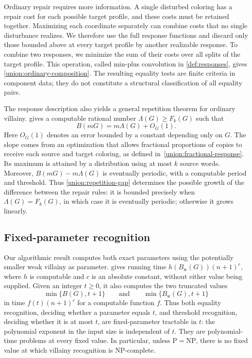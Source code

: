 \documentclass[11pt,reqno]{amsart}
\numberwithin{equation}{section}
\theoremstyle{definition}
\theoremstyle{remark}
\begin{document}
Ordinary repair requires more information. A single disturbed coloring
has a repair cost for each possible target profile, and these costs
must be retained together. Maximizing each coordinate separately can
combine costs that no single disturbance realizes. We therefore use
the full response functions and discard only those bounded above at
every target profile by another realizable response. To combine two
responses, we minimize the sum of their costs over all splits of the
target profile. This operation, called min-plus convolution in
\cref{def:responses}, gives \cref{union:ordinary-composition}.
The resulting equality tests are finite criteria in component data;
they do not constitute a structural classification of all equality
pairs.

The response description also yields a general repetition theorem
for ordinary villainy.  gives a
computable rational number $\Lambda(G)\ge F_k(G)$ such that
\[
 B(mG)=m\Lambda(G)+O_G(1).
\]
Here $O_G(1)$ denotes an error bounded by a constant depending only on
$G$. The slope comes from an optimization that allows fractional
proportions of copies to receive each source and target coloring,
as defined in~\eqref{union:fractional-response}.
Its maximum is attained by a distribution using at most $k$ source words.
Moreover, $B(mG)-m\Lambda(G)$ is eventually periodic, with a
computable period and threshold. Thus \cref{union:repetition-gap}
determines the possible growth of the difference between the repair
rules: it is bounded precisely when $\Lambda(G)=F_k(G)$, in which
case it is eventually periodic; otherwise it grows linearly.

\subsection{Fixed-parameter recognition}

Our algorithmic result computes both exact parameters using the
potentially smaller weak villainy as parameter. 
gives running time $h(B_{\mathrm w}(G))(n+1)^c$, where $h$ is
computable and $c$ is an absolute constant, without either value being
supplied. Given an integer $t\ge0$, it also computes
the two truncated values
\[
 \min\{B(G),t+1\}\qquad\text{and}\qquad
 \min\{B_{\mathrm w}(G),t+1\}
\]
in time $f(t)(n+1)^c$ for a computable function $f$.
Thus both equality recognition, deciding whether a parameter equals
$t$, and threshold recognition, deciding whether it is at most $t$,
are fixed-parameter tractable in $t$: the polynomial exponent in the
input size is independent of $t$. They are polynomial-time problems
at every fixed value.
In particular,
unless $\mathrm P=\mathrm{NP}$, there is no fixed value at which
villainy recognition is NP-complete.
\end{document}
